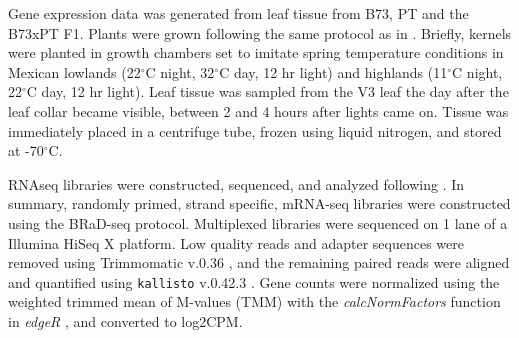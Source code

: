 \documentclass[9pt,twocolumn,twoside,lineno]{BioRxiv}
\begin{document}
Gene expression data was generated from leaf tissue from B73, PT and the B73xPT F1. Plants were grown following the same protocol as in \cite{Crow2020-gene}. Briefly, kernels were planted in growth chambers set to imitate spring temperature conditions in Mexican lowlands (22$^{\circ}$C night, 32$^{\circ}$C day, 12 hr light) and highlands (11$^{\circ}$C night, 22$^{\circ}$C day, 12 hr light). Leaf tissue was sampled from the V3 leaf the day after the leaf collar became visible, between 2 and 4 hours after lights came on. Tissue was immediately placed in a centrifuge tube, frozen using liquid nitrogen, and stored at -70$^{\circ}$C.

RNAseq libraries were constructed, sequenced, and analyzed following \cite{Crow2020-gene}. In summary, randomly primed, strand specific, mRNA-seq libraries were constructed using the BRaD-seq \cite{townsley2015brad} protocol. Multiplexed libraries were sequenced on 1 lane of a Illumina HiSeq X platform. Low quality reads and adapter sequences were removed using Trimmomatic v.0.36 \cite{bolger2014trimmomatic}, and the remaining paired reads were aligned and quantified using \texttt{kallisto} v.0.42.3 \cite{bray2016near}. Gene counts were normalized using the weighted trimmed mean of M-values (TMM) with the \textit{calcNormFactors} function in \textit{edgeR} \cite{robinson2010edger}, and converted to log2CPM.
\end{document}

